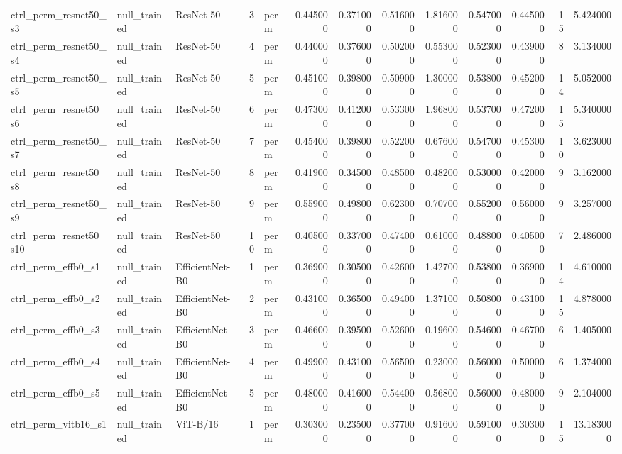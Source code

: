 \begin{table}
{\begin{tabular}{lllrlrrrrrrrr}
ctrl\_perm\_resnet50\_s3 & null\_trained & ResNet-50 & 3 & perm & 0.445000 & 0.371000 & 0.516000 & 1.816000 & 0.547000 & 0.445000 & 15 & 5.424000 \\
ctrl\_perm\_resnet50\_s4 & null\_trained & ResNet-50 & 4 & perm & 0.440000 & 0.376000 & 0.502000 & 0.553000 & 0.523000 & 0.439000 & 8 & 3.134000 \\
ctrl\_perm\_resnet50\_s5 & null\_trained & ResNet-50 & 5 & perm & 0.451000 & 0.398000 & 0.509000 & 1.300000 & 0.538000 & 0.452000 & 14 & 5.052000 \\
ctrl\_perm\_resnet50\_s6 & null\_trained & ResNet-50 & 6 & perm & 0.473000 & 0.412000 & 0.533000 & 1.968000 & 0.537000 & 0.472000 & 15 & 5.340000 \\
ctrl\_perm\_resnet50\_s7 & null\_trained & ResNet-50 & 7 & perm & 0.454000 & 0.398000 & 0.522000 & 0.676000 & 0.547000 & 0.453000 & 10 & 3.623000 \\
ctrl\_perm\_resnet50\_s8 & null\_trained & ResNet-50 & 8 & perm & 0.419000 & 0.345000 & 0.485000 & 0.482000 & 0.530000 & 0.420000 & 9 & 3.162000 \\
ctrl\_perm\_resnet50\_s9 & null\_trained & ResNet-50 & 9 & perm & 0.559000 & 0.498000 & 0.623000 & 0.707000 & 0.552000 & 0.560000 & 9 & 3.257000 \\
ctrl\_perm\_resnet50\_s10 & null\_trained & ResNet-50 & 10 & perm & 0.405000 & 0.337000 & 0.474000 & 0.610000 & 0.488000 & 0.405000 & 7 & 2.486000 \\
ctrl\_perm\_effb0\_s1 & null\_trained & EfficientNet-B0 & 1 & perm & 0.369000 & 0.305000 & 0.426000 & 1.427000 & 0.538000 & 0.369000 & 14 & 4.610000 \\
ctrl\_perm\_effb0\_s2 & null\_trained & EfficientNet-B0 & 2 & perm & 0.431000 & 0.365000 & 0.494000 & 1.371000 & 0.508000 & 0.431000 & 15 & 4.878000 \\
ctrl\_perm\_effb0\_s3 & null\_trained & EfficientNet-B0 & 3 & perm & 0.466000 & 0.395000 & 0.526000 & 0.196000 & 0.546000 & 0.467000 & 6 & 1.405000 \\
ctrl\_perm\_effb0\_s4 & null\_trained & EfficientNet-B0 & 4 & perm & 0.499000 & 0.431000 & 0.565000 & 0.230000 & 0.560000 & 0.500000 & 6 & 1.374000 \\
ctrl\_perm\_effb0\_s5 & null\_trained & EfficientNet-B0 & 5 & perm & 0.480000 & 0.416000 & 0.544000 & 0.568000 & 0.560000 & 0.480000 & 9 & 2.104000 \\
ctrl\_perm\_vitb16\_s1 & null\_trained & ViT-B/16 & 1 & perm & 0.303000 & 0.235000 & 0.377000 & 0.916000 & 0.591000 & 0.303000 & 15 & 13.183000 \\

\end{tabular}}
\end{table}
